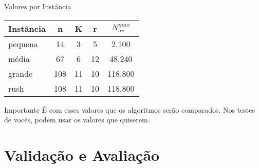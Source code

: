\documentclass[10pt]{beamer}
\begin{document}
\begin{frame}{Valores por Instância}
    \begin{table}
        \centering
        \small
        \begin{tabular}{lcccc}
            \toprule
            \textbf{Instância} & \textbf{n} & \textbf{K} & \textbf{r} & \textbf{$N^{max}_{av}$} \\
            \midrule
            pequena & 14 & 3 & 5 & 2.100 \\
            média & 67 & 6 & 12 & 48.240 \\
            grande & 108 & 11 & 10 & 118.800 \\
            rush & 108 & 11 & 10 & 118.800 \\
            \bottomrule
        \end{tabular}
    \end{table}
    
    \vspace{0.5cm}
    
    \begin{block}{Importante}
        É com esses valores que os algoritmos serão comparados. Nos testes de vocês, podem usar os valores que quiserem.
    \end{block}
\end{frame}

\section{Validação e Avaliação}
\end{document}
